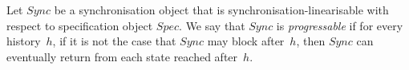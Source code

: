 \begin{definition}
Let $Sync$ be a synchronisation object that is synchronisation-linearisable
with respect to specification object $Spec$.  We say that $Sync$ is
\emph{progressable} if for every history~$h$, if it is not the case that $Sync$
may block after~$h$, then $Sync$ can eventually return from each state reached
after~$h$.
\end{definition}








